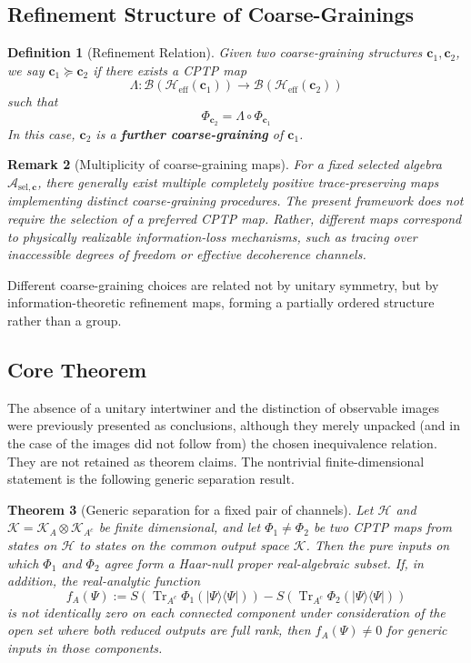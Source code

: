 \documentclass[12pt,a4paper,openany]{book}
\newtheorem{theorem}{Theorem}[chapter]
\newtheorem{definition}[theorem]{Definition}
\newtheorem{remark}[theorem]{Remark}
\begin{document}
\subsection{Refinement Structure of Coarse-Grainings}

\begin{definition}[Refinement Relation]
\label{H-A-def:refine}
Given two coarse-graining structures $\mathbf{c}_1, \mathbf{c}_2$, we say $\mathbf{c}_1 \succeq \mathbf{c}_2$ if there exists a CPTP map
\[
\Lambda: \mathcal{B}(\mathcal{H}_{\text{eff}}(\mathbf{c}_1)) \to \mathcal{B}(\mathcal{H}_{\text{eff}}(\mathbf{c}_2))
\]
such that
\[
\Phi_{\mathbf{c}_2} = \Lambda \circ \Phi_{\mathbf{c}_1}
\]
In this case, $\mathbf{c}_2$ is a \textbf{further coarse-graining} of $\mathbf{c}_1$.
\end{definition}

\begin{remark}[Multiplicity of coarse-graining maps]
For a fixed selected algebra $\mathcal{A}_{\mathrm{sel},\mathbf{c}}$, there generally exist multiple completely positive trace-preserving maps implementing distinct coarse-graining procedures.
The present framework does not require the selection of a preferred CPTP map. 
Rather, different maps correspond to physically realizable information-loss mechanisms, such as tracing over inaccessible degrees of freedom or effective decoherence channels.
\end{remark}

Different coarse-graining choices are related not by unitary symmetry, but by information-theoretic refinement maps, forming a partially ordered structure rather than a group.

\subsection{Core Theorem}

The absence of a unitary intertwiner and the distinction of observable images were previously presented as conclusions, although they merely unpacked (and in the case of the images did not follow from) the chosen inequivalence relation.  They are not retained as theorem claims.  The nontrivial finite-dimensional statement is the following generic separation result.

\begin{theorem}[Generic separation for a fixed pair of channels]
\label{H-A-thm:inequiv}
Let $\mathcal H$ and $\mathcal K=\mathcal K_A\otimes\mathcal K_{A^c}$ be finite dimensional, and let $\Phi_1\ne\Phi_2$ be two CPTP maps from states on $\mathcal H$ to states on the common output space $\mathcal K$.  Then the pure inputs on which $\Phi_1$ and $\Phi_2$ agree form a Haar-null proper real-algebraic subset.  If, in addition, the real-analytic function
\[
f_A(\Psi):=
S\!\left(\operatorname{Tr}_{A^c}\Phi_1(|\Psi\rangle\!\langle\Psi|)\right)
-S\!\left(\operatorname{Tr}_{A^c}\Phi_2(|\Psi\rangle\!\langle\Psi|)\right)
\]
is not identically zero on each connected component under consideration of the open set where both reduced outputs are full rank, then $f_A(\Psi)\ne0$ for generic inputs in those components.
\end{theorem}
\end{document}
